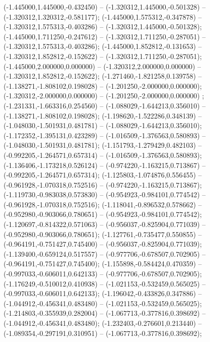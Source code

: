  (-1.445000,1.445000,-0.432450) -- (-1.320312,1.445000,-0.501328) -- (-1.320312,1.320312,-0.581177);
 (-1.445000,1.575312,-0.347878) -- (-1.320312,1.575313,-0.403286) -- (-1.320312,1.445000,-0.501328);
 (-1.445000,1.711250,-0.247612) -- (-1.320312,1.711250,-0.287051) -- (-1.320312,1.575313,-0.403286);
 (-1.445000,1.852812,-0.131653) -- (-1.320312,1.852812,-0.152622) -- (-1.320312,1.711250,-0.287051);
 (-1.445000,2.000000,0.000000) -- (-1.320312,2.000000,0.000000) -- (-1.320312,1.852812,-0.152622);
 (-1.271460,-1.821258,0.139758) -- (-1.138271,-1.808102,0.198028) -- (-1.201250,-2.000000,0.000000);
 (-1.320312,-2.000000,0.000000) -- (-1.201250,-2.000000,0.000000) ;
 (-1.231331,-1.663316,0.254560) -- (-1.088029,-1.644213,0.356010) -- (-1.138271,-1.808102,0.198028);
 (-1.198620,-1.522286,0.348139) -- (-1.048030,-1.501931,0.481781) -- (-1.088029,-1.644213,0.356010);
 (-1.172352,-1.395131,0.423289) -- (-1.016509,-1.376563,0.580893) -- (-1.048030,-1.501931,0.481781);
 (-1.151793,-1.279429,0.482103) -- (-0.992205,-1.264571,0.657314) -- (-1.016509,-1.376563,0.580893);
 (-1.136406,-1.173218,0.526124) -- (-0.974220,-1.163215,0.713867) -- (-0.992205,-1.264571,0.657314);
 (-1.125803,-1.074876,0.556455) -- (-0.961928,-1.070318,0.752516) -- (-0.974220,-1.163215,0.713867);
 (-1.119730,-0.983038,0.573830) -- (-0.954923,-0.984101,0.774542) -- (-0.961928,-1.070318,0.752516);
 (-1.118041,-0.896532,0.578662) -- (-0.952980,-0.903066,0.780651) -- (-0.954923,-0.984101,0.774542);
 (-1.120697,-0.814322,0.571063) -- (-0.956037,-0.825904,0.771039) -- (-0.952980,-0.903066,0.780651);
 (-1.127761,-0.735477,0.550855) -- (-0.964191,-0.751427,0.745400) -- (-0.956037,-0.825904,0.771039);
 (-1.139400,-0.659124,0.517557) -- (-0.977706,-0.678507,0.702905) -- (-0.964191,-0.751427,0.745400);
 (-1.155898,-0.584424,0.470359) -- (-0.997033,-0.606011,0.642133) -- (-0.977706,-0.678507,0.702905);
 (-1.176249,-0.510012,0.410938) -- (-1.021153,-0.532459,0.565025) -- (-0.997033,-0.606011,0.642133);
 (-1.196042,-0.433826,0.347886) -- (-1.044912,-0.456341,0.483480) -- (-1.021153,-0.532459,0.565025);
 (-1.214803,-0.355939,0.282004) -- (-1.067713,-0.377816,0.398692) -- (-1.044912,-0.456341,0.483480);
 (-1.232403,-0.276601,0.213440) -- (-1.089354,-0.297191,0.310951) -- (-1.067713,-0.377816,0.398692);
